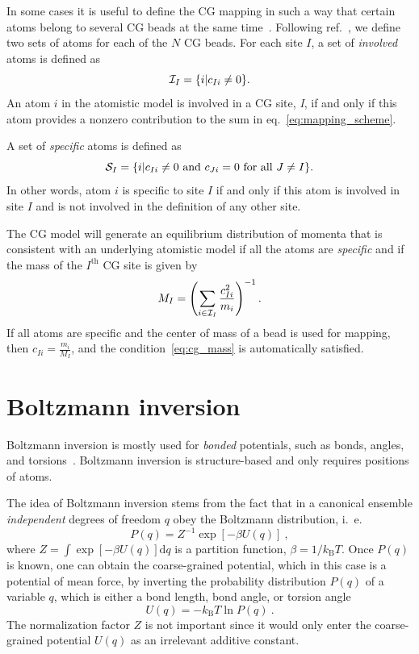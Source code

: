 In some cases it is useful to define the CG mapping in such a way that certain atoms belong to several CG beads at the same time~\cite{Fritz:2009}. Following ref.~\cite{Noid:2008.1}, we define two sets of atoms for each of the $N$ CG beads. For each site $I$, a set of {\em involved} atoms is defined as
\begin{equation}
 {\cal I}_I=\{i|c_{Ii}\ne0\}.
\end{equation}
An atom $i$ in the atomistic model is involved in a CG site, \textit{I}, if and only if this atom provides a nonzero contribution to the sum in eq.~\ref{eq:mapping_scheme}.

A set of {\em specific} atoms is defined as
\begin{equation}
 {\cal S}_I=\{i|c_{Ii}\ne0 \text{ and } c_{Ji}=0 \text{ for all } J \ne I\}.
\end{equation}
In other words, atom $i$ is specific to site $I$ if and only if this atom is involved in site $I$ and is not involved in the definition of any other site.

The CG model will generate an equilibrium distribution of momenta that is consistent with an underlying atomistic model if all the atoms are {\em specific} and if the mass of the $I^\text{th}$ CG site is given by~\cite{Noid:2008.1}
\begin{equation}
M_I= \left( \sum_{i \in {\cal I}_I}\frac{c_{Ii}^2}{m_i} \right)^{-1}.
\label{eq:cg_mass}
\end{equation}
%
If all atoms are specific and the center of mass of a bead is used for mapping, then $c_{Ii} = \frac{m_i}{M_I}$, and the condition~\ref{eq:cg_mass} is automatically satisfied.

\section{Boltzmann inversion}
\label{sec:bi}

Boltzmann inversion is mostly used for {\em bonded} potentials, such as bonds, angles, and torsions~\cite{Tschoep:1998}. Boltzmann inversion is structure-based and only requires positions of atoms.

The idea of Boltzmann inversion stems from the fact that in a canonical ensemble {\em independent} degrees of freedom $q$ obey the Boltzmann distribution, i.~e.
%
\begin{equation}
  P(q) = Z^{-1} \exp\left[ - \beta U(q) \right]~,
  \label{eq:boltzmann}
\end{equation}
%
where \mbox{$Z = \int \exp \left[ - \beta U(q) \right] \text{d}q $} is a partition function, \mbox{$\beta = 1/k_\text{B} T$}.
%
Once $P(q)$ is known, one can obtain the coarse-grained potential, which in this case is a potential of mean force, by inverting the probability distribution $P(q)$ of a variable $q$, which is either a bond length, bond angle, or torsion angle
\begin{equation}
  U(q) = - k_\text{B} T \ln  P(q) ~.
  \label{eq:inv_boltzmann}
\end{equation}
%
The normalization factor $Z$ is not important since it would only enter the coarse-grained potential $U(q)$ as an irrelevant additive constant.

